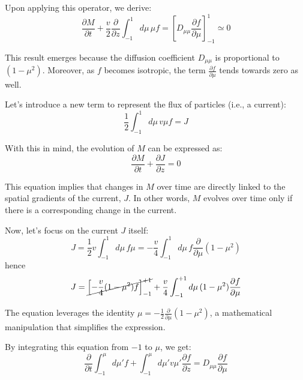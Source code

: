Upon applying this operator, we derive:
%
\begin{equation}
\frac{\partial M}{\partial t} +\frac{v}{2}\frac{\partial}{\partial z}\int_{-1}^1 d\mu \, \mu f= \left[ {D_{\mu\mu}\frac{\partial f}{\partial \mu}} \right]_{-1}^{1} \simeq 0
\end{equation}

This result emerges because the diffusion coefficient \( D_{\mu\mu} \) is proportional to \( (1-\mu^2) \). Moreover, as \( f \) becomes isotropic, the term \( \frac{\partial f}{\partial \mu} \) tends towards zero as well. 

Let's introduce a new term to represent the flux of particles (i.e., a current):
%
\begin{equation}\label{eq:defj}
\frac{1}{2}\int_{-1}^1 d\mu \, v\mu f = J
\end{equation}

With this in mind, the evolution of \( M \) can be expressed as:
%
\begin{equation}\label{eq:jmcont}
\frac{\partial M}{\partial t} + \frac{\partial J}{\partial z} = 0
\end{equation}

This equation implies that changes in \( M \) over time are directly linked to the spatial gradients of the current, \( J \). In other words, \( M \) evolves over time only if there is a corresponding change in the current.

Now, let's focus on the current \( J \) itself:
%
\begin{equation}
J 
= \frac{1}{2} v\int_{-1}^1 d\mu \, f\mu  
= -\frac{v}{4}\int_{-1}^1 d\mu \, f\frac{\partial}{\partial \mu}(1-\mu^2) 
\end{equation}
%
hence
%
\begin{equation}\label{eq:jpartialmu}
J = \cancel{\left[ -\frac{v}{4}(1-\mu^2)f \right]_{-1}^{+1}} + \frac{v}{4}\int_{-1}^{+1} d\mu \, (1-\mu^2) \frac{\partial f}{\partial \mu}
\end{equation}

The equation leverages the identity \(\mu = -\frac{1}{2}\frac{\partial}{\partial \mu}(1-\mu^2)\), a mathematical manipulation that simplifies the expression.

By integrating this equation from \( -1 \) to \( \mu \), we get:
%
\begin{equation}
\frac{\partial}{\partial t}\int_{-1}^{\mu} d\mu' f +\int_{-1}^{\mu} d\mu' v\mu' \frac{\partial f}{\partial z}=D_{\mu\mu}\frac{\partial f}{\partial \mu}
\end{equation}

